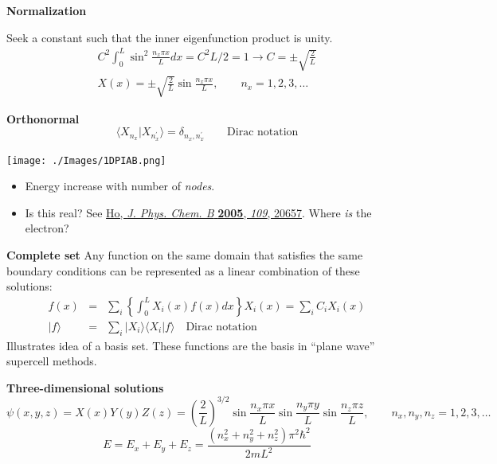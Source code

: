 \documentclass[11pt]{article}
\begin{document}
\textbf{Normalization}

Seek a constant such that the inner eigenfunction product is unity.
\begin{eqnarray}
C^2 \int_0^L \sin^2 \frac{n_x\pi x}{L} dx = C^2 L/2 = 1 \rightarrow C=\pm\sqrt{\frac{2}{L}}\\
X(x) = \pm\sqrt{\frac{2}{L}}\sin\frac{n_x\pi x}{L},\qquad n_x = 1,2,3,\ldots
\end{eqnarray}

\textbf{Orthonormal}
\begin{equation}
\langle X_{n_x} | X_{n^\prime_x} \rangle = \delta_{n_{x},n_x^\prime}\qquad
\text{Dirac notation}
\end{equation}

\begin{center}
\texttt{[image: ./Images/1DPIAB.png]}
\end{center}

\begin{itemize}
\item Energy increase with number of \emph{nodes}.

\item Is this real?  See \href{http://dx.doi.org/10.1021/jp053496l}{Ho, \emph{J. Phys. Chem. B} \textbf{2005}, \emph{109}, 20657}.  Where \emph{is} the electron?
\end{itemize}

\textbf{Complete set}
Any function on the same domain that satisfies the same boundary conditions can be represented as a linear combination of these solutions:
\begin{eqnarray}
f(x) &=& \sum_i \left \{\int_0^L X_i(x) f(x) dx \right \}  X_i(x)  = \sum_i C_i X_i(x)\\
|f\rangle &= &\sum_i |X_i\rangle\langle X_i | f\rangle\quad\text{Dirac notation}
\end{eqnarray}
Illustrates idea of a basis set. These functions are the basis in ``plane wave'' supercell methods.

\textbf{Three-dimensional solutions}
\begin{equation}
\psi(x,y,z) = X(x)Y(y)Z(z) = \left ( \frac{2}{L} \right )^{3/2} \sin\frac{n_x\pi x}{L}\sin\frac{n_y\pi y}{L}\sin\frac{n_z\pi z}{L},\qquad n_{x},n_{y},n_{z}=1,2,3,\ldots
\end{equation}
\begin{equation}
\label{eq:2}
E = E_{x}+E_{y}+E_{z}=\frac{(n_{x}^{2}+n_{y}^{2}+n_{z}^{2}) \pi^{2}\hbar^{2}}{2 m L^{2}}
\end{equation}
\end{document}
